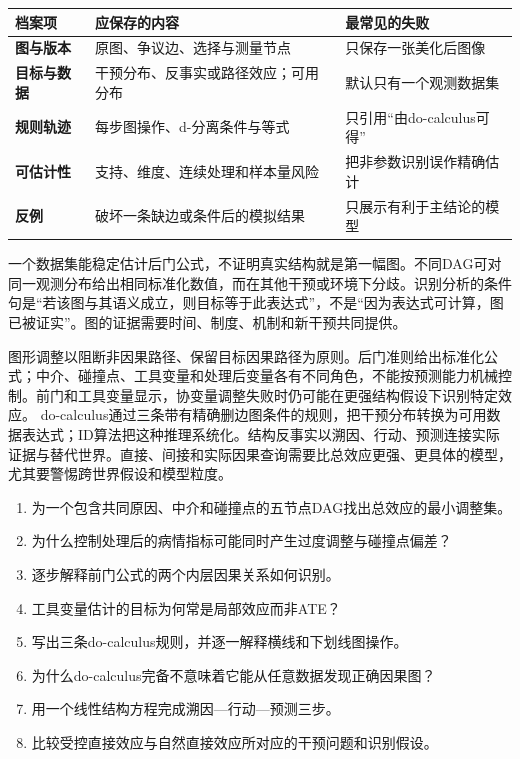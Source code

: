 \begin{center}
\small
\begin{tabularx}{\textwidth}{>{\bfseries}p{2.2cm}X X}
\toprule
档案项 & 应保存的内容 & 最常见的失败\\
\midrule
图与版本 & 原图、争议边、选择与测量节点 & 只保存一张美化后图像\\
目标与数据 & 干预分布、反事实或路径效应；可用分布 & 默认只有一个观测数据集\\
规则轨迹 & 每步图操作、d-分离条件与等式 & 只引用“由do-calculus可得”\\
可估计性 & 支持、维度、连续处理和样本量风险 & 把非参数识别误作精确估计\\
反例 & 破坏一条缺边或条件后的模拟结果 & 只展示有利于主结论的模型\\
\bottomrule
\end{tabularx}
\end{center}

\begin{failurecheck}[用识别公式反推因果图]
一个数据集能稳定估计后门公式，不证明真实结构就是第一幅图。不同DAG可对同一观测分布给出相同标准化数值，而在其他干预或环境下分歧。识别分析的条件句是“若该图与其语义成立，则目标等于此表达式”，不是“因为表达式可计算，图已被证实”。图的证据需要时间、制度、机制和新干预共同提供。
\end{failurecheck}

\begin{chapterreview}
图形调整以阻断非因果路径、保留目标因果路径为原则。后门准则给出标准化公式；中介、碰撞点、工具变量和处理后变量各有不同角色，不能按预测能力机械控制。前门和工具变量显示，协变量调整失败时仍可能在更强结构假设下识别特定效应。 do-calculus通过三条带有精确删边图条件的规则，把干预分布转换为可用数据表达式；ID算法把这种推理系统化。结构反事实以溯因、行动、预测连接实际证据与替代世界。直接、间接和实际因果查询需要比总效应更强、更具体的模型，尤其要警惕跨世界假设和模型粒度。
\end{chapterreview}

\begin{selfcheck}
\begin{enumerate}
  \item 为一个包含共同原因、中介和碰撞点的五节点DAG找出总效应的最小调整集。
  \item 为什么控制处理后的病情指标可能同时产生过度调整与碰撞点偏差？
  \item 逐步解释前门公式的两个内层因果关系如何识别。
  \item 工具变量估计的目标为何常是局部效应而非ATE？
  \item 写出三条do-calculus规则，并逐一解释横线和下划线图操作。
  \item 为什么do-calculus完备不意味着它能从任意数据发现正确因果图？
  \item 用一个线性结构方程完成溯因---行动---预测三步。
  \item 比较受控直接效应与自然直接效应所对应的干预问题和识别假设。
\end{enumerate}
\end{selfcheck}

